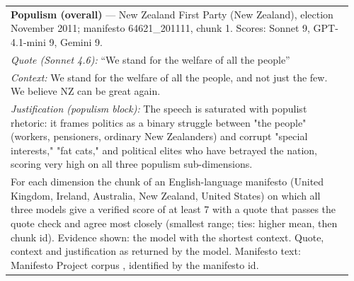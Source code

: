 {\begin{longtable}{p{0.96\linewidth}}
\midrule
\textbf{Populism (overall)} --- New Zealand First Party (New Zealand), election November 2011; manifesto 64621\_201111, chunk 1. Scores: Sonnet 9, GPT-4.1-mini 9, Gemini 9. \\
\quad \emph{Quote (Sonnet 4.6):} ``We stand for the welfare of all the people'' \\
\quad \emph{Context:} We stand for the welfare of all the people, and not just the few. We believe NZ can be great again. \\
\quad \emph{Justification (populism block):} The speech is saturated with populist rhetoric: it frames politics as a binary struggle between "the people" (workers, pensioners, ordinary New Zealanders) and corrupt "special interests," "fat cats," and political elites who have betrayed the nation, scoring very high on all three populism sub-dimensions. \\
\bottomrule
\multicolumn{1}{p{0.96\linewidth}}{\scriptsize For each dimension the chunk of an English-language manifesto (United Kingdom, Ireland, Australia, New Zealand, United States) on which all three models give a verified score of at least 7 with a quote that passes the quote check and agree most closely (smallest range; ties: higher mean, then chunk id). Evidence shown: the model with the shortest context. Quote, context and justification as returned by the model. Manifesto text: Manifesto Project corpus \citep{lehmann2026manifesto}, identified by the manifesto id.} \\
\end{longtable}
}
